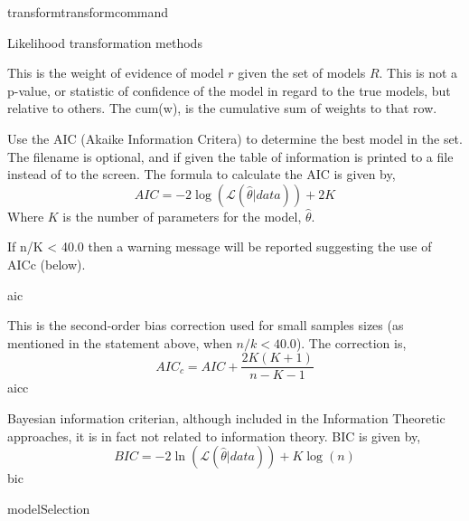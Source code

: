 \begin{command}{transform}{transformcommand}
\begin{arguments}
\begin{argumentgroup}{Likelihood transformation methods}
{                This is the weight of evidence of model $r$ given the set of
                models $R$. This is not a p-value, or statistic of confidence of
                the model in regard to the true models, but relative to others.
                The cum(w), is the cumulative sum of weights to that row.

                \begin{description}

                        {Use the AIC (Akaike Information Critera) to determine
                        the best model in the set. The filename is optional, and
                        if given the table of information is printed to a file
                        instead of to the screen. The formula to calculate the
                        AIC is given by,
                        \begin{equation*}
                            AIC = - 2 \log(\mathcal{L}(\hat{\theta}|data)) + 2 K
                        \end{equation*}
                        Where $K$ is the number of parameters for the model,
                        $\hat{\theta}$. 
                        \begin{statement}
                            If n/K < 40.0 then a warning message will be
                            reported suggesting the use of AICc (below).
                        \end{statement} }
                        {aic}

                        {This is the second-order bias correction used for small
                        samples sizes (as mentioned in the statement above, when
                        $n/k < 40.0$). The correction is,
                        \begin{equation*}
                            AIC_c = AIC + \frac{2K(K+1)} {n-K-1}
                        \end{equation*}}
                        {aicc}

                        { Bayesian information criterian, although included in
                        the Information Theoretic approaches, it is in fact not
                        related to information theory. BIC is given by,
                        \begin{equation*}
                            BIC = - 2 \ln(\mathcal{L}(\hat{\theta}|data)) + K \log(n)
                        \end{equation*}}
                        {bic}
                \end{description}}
            {modelSelection}



\end{argumentgroup}
\end{arguments}
\end{command}
